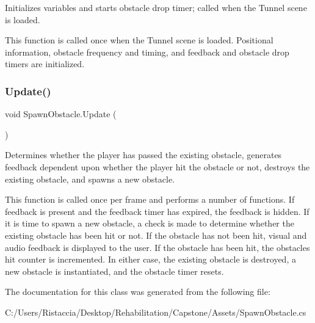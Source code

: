 Initializes variables and starts obstacle drop timer; called when the Tunnel scene is loaded.

This function is called once when the Tunnel scene is loaded. Positional information, obstacle frequency and timing, and feedback and obstacle drop timers are initialized. \mbox{\label{class_spawn_obstacle_abf68463f09c58b50d42ede1be0a5d7ec}} 
\subsubsection{\texorpdfstring{Update()}{Update()}}
{\footnotesize\ttfamily void Spawn\+Obstacle.\+Update (\begin{DoxyParamCaption}{ }\end{DoxyParamCaption})\hspace{0.3cm}{\ttfamily [private]}}

Determines whether the player has passed the existing obstacle, generates feedback dependent upon whether the player hit the obstacle or not, destroys the existing obstacle, and spawns a new obstacle.

This function is called once per frame and performs a number of functions. If feedback is present and the feedback timer has expired, the feedback is hidden. If it is time to spawn a new obstacle, a check is made to determine whether the existing obstacle has been hit or not. If the obstacle has not been hit, visual and audio feedback is displayed to the user. If the obstacle has been hit, the obstacles hit counter is incremented. In either case, the existing obstacle is destroyed, a new obstacle is instantiated, and the obstacle timer resets. 

The documentation for this class was generated from the following file\+:\begin{DoxyCompactItemize}
\item 
C\+:/\+Users/\+Ristaccia/\+Desktop/\+Rehabilitation/\+Capstone/\+Assets/Spawn\+Obstacle.\+cs\end{DoxyCompactItemize}

